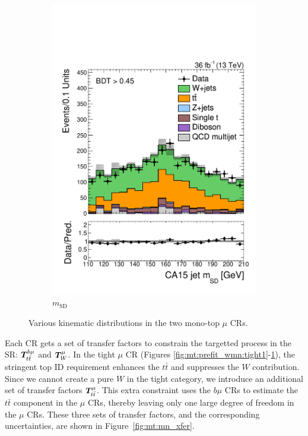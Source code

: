 \begin{figure}[]
\begin{center}
\begin{subfigure}[t]{0.32\textwidth}
            \includegraphics[width=\textwidth]{figures/monotop/prefit/singlemuonw_tight_fj1MSD.pdf}
            \caption{$m_\mathrm{SD}$}
            \label{fig:mt:prefit_wmn:tight2}
        \end{subfigure}
        \caption{Various kinematic distributions in the two mono-top $\mu$ CRs. }
        \label{fig:mt:prefit_wmn}
    \end{center}
\end{figure}

Each CR gets a set of transfer factors to constrain the targetted process in the SR: $\bm{T}^{b\mu}_{t\bar{t}}$ and $\bm{T}^{\mu}_{W}$. 
In the tight $\mu$ CR (Figures \ref{fig:mt:prefit_wmn:tight1}-\ref{fig:mt:prefit_wmn:tight2}), the stringent top ID requirement enhances the $t\bar{t}$ and suppresses the $W$ contribution. 
Since we cannot create a pure $W$ in the tight category, we introduce an additional set of transfer factors $\bm{T}^{\mu}_{t\bar{t}}$. 
This extra constraint uses the $b\mu$ CRs to estimate the $t\bar{t}$ component in the $\mu$ CRs, thereby leaving only one large degree of freedom in the $\mu$ CRs.
These three sets of transfer factors, and the corresponding uncertainties, are shown in Figure~\ref{fig:mt:mn_xfer}. 


